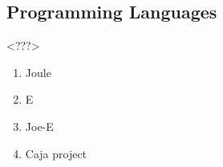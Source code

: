 \subsection{Programming Languages}
\label{subsec:proglang}
<???>
	\begin{enumerate}
		\item Joule
		\item E
		\item Joe-E
		\item Caja project
	\end{enumerate}